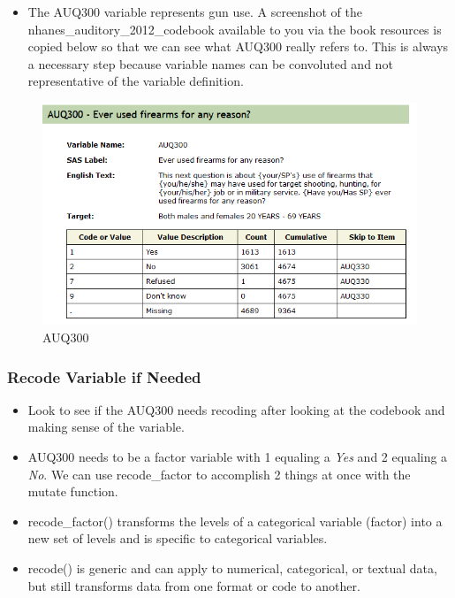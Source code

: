 \documentclass[
  letterpaper,
  DIV=11,
  numbers=noendperiod]{scrreprt}
\providecommand{\tightlist}{%
  \setlength{\itemsep}{0pt}\setlength{\parskip}{0pt}}\usepackage{longtable,booktabs,array}
\begin{document}
\begin{itemize}
\tightlist
\item
  The AUQ300 variable represents gun use. A screenshot of the
  nhanes\_auditory\_2012\_codebook available to you via the book
  resources is copied below so that we can see what AUQ300 really refers
  to. This is always a necessary step because variable names can be
  convoluted and not representative of the variable definition.
\end{itemize}

\begin{figure}[H]

{\centering \includegraphics{Pictures/Ch3/AUQ300.png}

}

\caption{AUQ300}

\end{figure}%

\subsubsection{Recode Variable if
Needed}\label{recode-variable-if-needed}

\begin{itemize}
\tightlist
\item
  Look to see if the AUQ300 needs recoding after looking at the codebook
  and making sense of the variable.
\item
  AUQ300 needs to be a factor variable with 1 equaling a \emph{Yes} and
  2 equaling a \emph{No}. We can use recode\_factor to accomplish 2
  things at once with the mutate function.
\item
  recode\_factor() transforms the levels of a categorical variable
  (factor) into a new set of levels and is specific to categorical
  variables.
\item
  recode() is generic and can apply to numerical, categorical, or
  textual data, but still transforms data from one format or code to
  another.
\end{itemize}
\end{document}
